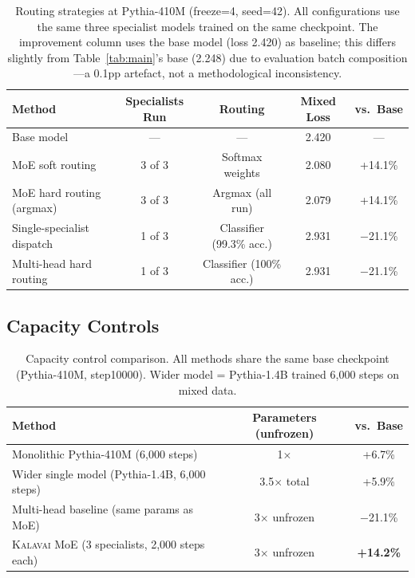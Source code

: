 \documentclass{article}
\newcommand{\kalavai}{\textsc{Kalavai}\xspace}
\begin{document}
\begin{table}[h]
\centering
\caption{Routing strategies at Pythia-410M (freeze=4, seed=42). All configurations use the same three specialist models trained on the same checkpoint. The improvement column uses the base model (loss 2.420) as baseline; this differs slightly from Table~\ref{tab:main}'s base (2.248) due to evaluation batch composition---a 0.1pp artefact, not a methodological inconsistency.}
\label{tab:dispatch}
\begin{tabular}{lcccc}
\toprule
\textbf{Method} & \textbf{Specialists Run} & \textbf{Routing} & \textbf{Mixed Loss} & \textbf{vs.\ Base} \\
\midrule
Base model                    & ---    & ---                    & 2.420 & ---       \\
MoE soft routing              & 3 of 3 & Softmax weights        & 2.080 & +14.1\%   \\
MoE hard routing (argmax)     & 3 of 3 & Argmax (all run)       & 2.079 & +14.1\%   \\
Single-specialist dispatch    & 1 of 3 & Classifier (99.3\% acc.) & 2.931 & $-$21.1\% \\
Multi-head hard routing       & 1 of 3 & Classifier (100\% acc.)  & 2.931 & $-$21.1\% \\
\bottomrule
\end{tabular}
\end{table}

\subsection*{Capacity Controls}

\begin{table}[h]
\centering
\caption{Capacity control comparison. All methods share the same base checkpoint (Pythia-410M, step10000). Wider model = Pythia-1.4B trained 6,000 steps on mixed data.}
\label{tab:capacity}
\begin{tabular}{lcc}
\toprule
\textbf{Method} & \textbf{Parameters (unfrozen)} & \textbf{vs.\ Base} \\
\midrule
Monolithic Pythia-410M (6,000 steps) & 1$\times$ & +6.7\% \\
Wider single model (Pythia-1.4B, 6,000 steps) & 3.5$\times$ total & +5.9\% \\
Multi-head baseline (same params as MoE) & 3$\times$ unfrozen & $-$21.1\% \\
\kalavai MoE (3 specialists, 2,000 steps each) & 3$\times$ unfrozen & \textbf{+14.2\%} \\
\bottomrule
\end{tabular}
\end{table}
\end{document}
